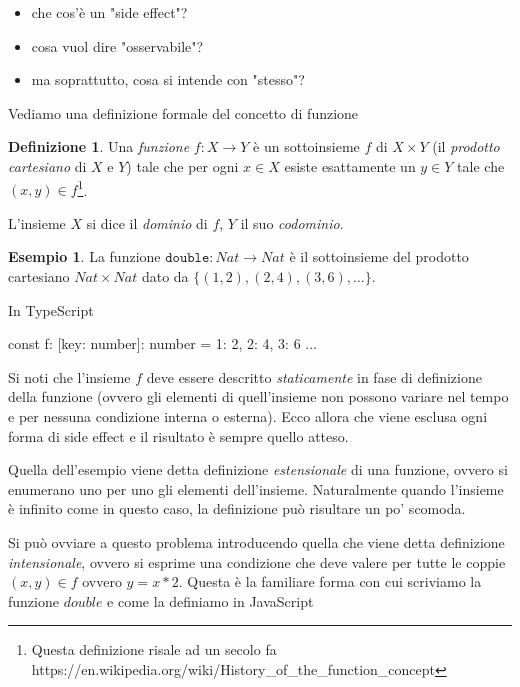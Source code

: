 \documentclass[12pt]{article}
\theoremstyle{definition}
\newtheorem{definition}{Definizione}[section]
\newtheorem{example}{Esempio}[section]
\newenvironment{code}
  {\vspace{0.5cm} \VerbatimEnvironment\begin{typescriptcode}}
  {\end{typescriptcode} \vspace{0.2cm}}
\begin{document}
\begin{itemize}
\item che cos'è un "side effect"?
\item cosa vuol dire "osservabile"?
\item ma soprattutto, cosa si intende con "stesso"?
\end{itemize}

Vediamo una definizione formale del concetto di funzione

\begin{definition}
Una \emph{funzione} $f: X \rightarrow Y$ è un sottoinsieme $f$ di $X \times Y$ (il \emph{prodotto cartesiano} di $X$ e $Y$) tale che
per ogni $x \in X$ esiste esattamente un $y \in Y$ tale che $(x, y) \in f$\footnote{Questa definizione risale ad un secolo fa https://en.wikipedia.org/wiki/History\_of\_the\_function\_concept}.
\end{definition}

L'insieme $X$ si dice il \emph{dominio} di $f$, $Y$ il suo \emph{codominio}.

\begin{example}
La funzione $\texttt{double}: Nat \rightarrow Nat$ è il sottoinsieme del prodotto cartesiano $Nat \times Nat$ dato da $\{ (1, 2), (2, 4), (3, 6), \ldots \}$.
\end{example}

In TypeScript

\begin{code}
const f: { [key: number]: number } = {
  1: 2,
  2: 4,
  3: 6
  ...
}
\end{code}

Si noti che l'insieme $f$ deve essere descritto \emph{staticamente} in fase di definizione della funzione
(ovvero gli elementi di quell'insieme non possono variare nel tempo e per nessuna condizione interna o esterna).
Ecco allora che viene esclusa ogni forma di side effect e il risultato è sempre quello atteso.

Quella dell'esempio viene detta definizione \emph{estensionale} di una funzione, ovvero si enumerano uno per uno gli elementi dell'insieme.
Naturalmente quando l'insieme è infinito come in questo caso, la definizione può risultare un po' scomoda.

Si può ovviare a questo problema introducendo quella che viene detta definizione \emph{intensionale},
ovvero si esprime una condizione che deve valere per tutte le coppie $(x, y) \in f$ ovvero $y = x * 2$. Questa è la familiare forma con cui scriviamo la funzione $double$ e come la definiamo in JavaScript
\end{document}
